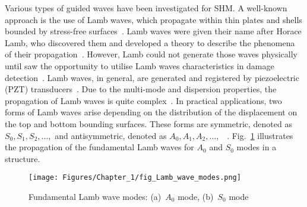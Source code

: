 Various types of guided waves have been investigated for SHM. 
A well-known approach is the use of Lamb waves, which propagate within thin plates and shells bounded by stress-free surfaces~\cite{Mitra2016}.
Lamb waves were given their name after Horace Lamb, who discovered them and developed a theory to describe the phenomena of their propagation~\cite{Ostachowicz2012}. 
However, Lamb could not generate those waves physically until \textcite{Worlton1961} saw the opportunity to utilise Lamb waves 
characteristics in damage detection~\cite{Ostachowicz2012}.
Lamb waves, in general, are generated and registered by piezoelectric (PZT) transducers~\cite{Cai2012}.
Due to the multi-mode and dispersion properties, the propaga\-tion of Lamb waves is quite complex~\cite{Ostachowicz2012}. 
In practical applications, two forms of Lamb waves arise depending on the distribution of the displacement on the top and bottom bounding surfaces.
These forms are symmetric, denoted as \(S_0, S_1, S_2,\dots,\) and antisymmetric, denoted as \(A_0,A_1,A_2,\dots,\) ~\cite{Ostachowicz2012}. 
Fig.~\ref{fig:LambModes} illustrates the propagation of the fundamental Lamb waves for \(A_0\) and \(S_0\) modes in a structure.
\begin{figure}[!ht]
	\begin{center}
		\centering
		\texttt{[image: Figures/Chapter\_1/fig\_Lamb\_wave\_modes.png]}
	\end{center}
	\caption{Fundamental Lamb wave modes: (a)~\(A_0\) mode, (b)~\( S_0\) mode} 
	\label{fig:LambModes}
\end{figure} 

